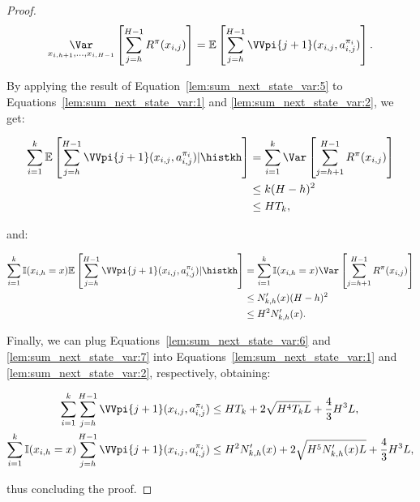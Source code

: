 \begin{proof}
\begin{equation}
\label{lem:sum_next_state_var:5}
    \underset{x_{i,h+1}, \ldots, x_{i, H-1}}{\Var} \left[ \sum_{j=h}^{H-1} R^\pi (x_{i,j}) \right] = \mathbb{E} \left[ \sum_{j=h}^{H-1} \VVpi{j+1} (x_{i,j}, a_{i,j}^{\pi_i}) \right].
\end{equation}

By applying the result of Equation~\eqref{lem:sum_next_state_var:5} to Equations~\eqref{lem:sum_next_state_var:1} and \eqref{lem:sum_next_state_var:2}, we get:

\begin{align}
    \sum_{i=1}^k \mathbb{E} \left[ \sum_{j=h}^{H-1} \VVpi{j+1} (x_{i,j}, a_{i,j}^{\pi_i}) | \histkh \right] &= \sum_{i=1}^k \Var \left[ \sum_{j=h+1}^{H-1} R^\pi (x_{i,j}) \right] \nonumber \\
    &\le k (H-h)^2 \nonumber \\
    &\le H T_k, \label{lem:sum_next_state_var:6}
\end{align}

and:

\begin{align}
    \sum_{i=1}^k \mathbb{I}(x_{i,h}=x) \mathbb{E} \left[ \sum_{j=h}^{H-1} \VVpi{j+1} (x_{i,j}, a_{i,j}^{\pi_i}) | \histkh \right] &= \sum_{i=1}^k \mathbb{I}(x_{i,h}=x) \Var\left[ \sum_{j=h+1}^{H-1} R^\pi (x_{i,j}) \right] \nonumber \\
    &\le N'_{k,h}(x) (H-h)^2 \nonumber \\
    &\le H^2 N'_{k,h}(x). \label{lem:sum_next_state_var:7}
\end{align}

Finally, we can plug Equations~\eqref{lem:sum_next_state_var:6} and \eqref{lem:sum_next_state_var:7} into Equations~\eqref{lem:sum_next_state_var:1} and \eqref{lem:sum_next_state_var:2}, respectively, obtaining:

\begin{align*}
    \sum_{i=1}^k \sum_{j=h}^{H-1} \VVpi{j+1} (x_{i,j}, a_{i,j}^{\pi_i}) &\le HT_k + 2\sqrt{H^4 T_k L} + \frac{4}{3}H^3L, \\
    \sum_{i=1}^k \mathbb{I}(x_{i,h}=x) \sum_{j=h}^{H-1} \VVpi{j+1} (x_{i,j}, a_{i,j}^{\pi_i}) &\le H^2 N'_{k,h}(x) + 2 \sqrt{H^5 N'_{k,h}(x) L} + \frac{4}{3} H^3 L,
\end{align*}

thus concluding the proof.
\end{proof}


